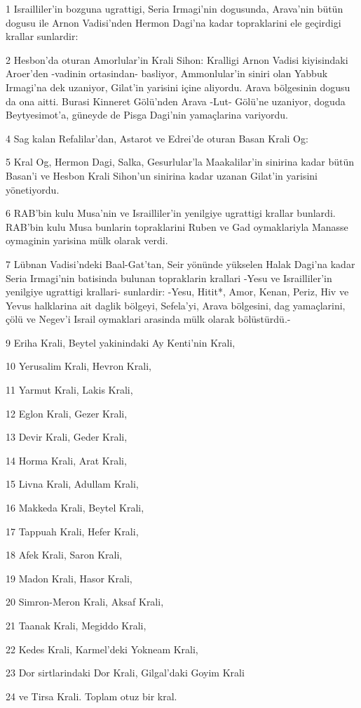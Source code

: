 \par 1 Israilliler'in bozguna ugrattigi, Seria Irmagi'nin dogusunda, Arava'nin bütün dogusu ile Arnon Vadisi'nden Hermon Dagi'na kadar topraklarini ele geçirdigi krallar sunlardir:
\par 2 Hesbon'da oturan Amorlular'in Krali Sihon: Kralligi Arnon Vadisi kiyisindaki Aroer'den -vadinin ortasindan- basliyor, Ammonlular'in siniri olan Yabbuk Irmagi'na dek uzaniyor, Gilat'in yarisini içine aliyordu. Arava bölgesinin dogusu da ona aitti. Burasi Kinneret Gölü'nden Arava -Lut- Gölü'ne uzaniyor, doguda Beytyesimot'a, güneyde de Pisga Dagi'nin yamaçlarina variyordu.
\par 4 Sag kalan Refalilar'dan, Astarot ve Edrei'de oturan Basan Krali Og:
\par 5 Kral Og, Hermon Dagi, Salka, Gesurlular'la Maakalilar'in sinirina kadar bütün Basan'i ve Hesbon Krali Sihon'un sinirina kadar uzanan Gilat'in yarisini yönetiyordu.
\par 6 RAB'bin kulu Musa'nin ve Israilliler'in yenilgiye ugrattigi krallar bunlardi. RAB'bin kulu Musa bunlarin topraklarini Ruben ve Gad oymaklariyla Manasse oymaginin yarisina mülk olarak verdi.
\par 7 Lübnan Vadisi'ndeki Baal-Gat'tan, Seir yönünde yükselen Halak Dagi'na kadar Seria Irmagi'nin batisinda bulunan topraklarin krallari -Yesu ve Israilliler'in yenilgiye ugrattigi krallari- sunlardir: -Yesu, Hitit*, Amor, Kenan, Periz, Hiv ve Yevus halklarina ait daglik bölgeyi, Sefela'yi, Arava bölgesini, dag yamaçlarini, çölü ve Negev'i Israil oymaklari arasinda mülk olarak bölüstürdü.-
\par 9 Eriha Krali, Beytel yakinindaki Ay Kenti'nin Krali,
\par 10 Yerusalim Krali, Hevron Krali,
\par 11 Yarmut Krali, Lakis Krali,
\par 12 Eglon Krali, Gezer Krali,
\par 13 Devir Krali, Geder Krali,
\par 14 Horma Krali, Arat Krali,
\par 15 Livna Krali, Adullam Krali,
\par 16 Makkeda Krali, Beytel Krali,
\par 17 Tappuah Krali, Hefer Krali,
\par 18 Afek Krali, Saron Krali,
\par 19 Madon Krali, Hasor Krali,
\par 20 Simron-Meron Krali, Aksaf Krali,
\par 21 Taanak Krali, Megiddo Krali,
\par 22 Kedes Krali, Karmel'deki Yokneam Krali,
\par 23 Dor sirtlarindaki Dor Krali, Gilgal'daki Goyim Krali
\par 24 ve Tirsa Krali. Toplam otuz bir kral.

